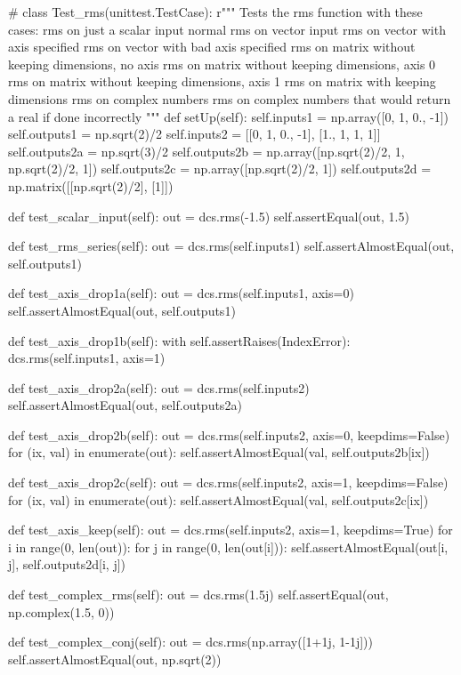 \documentclass[12pt]{article}
\begin{document}
\begin{Python}
#%
class Test_rms(unittest.TestCase):
    r"""
    Tests the rms function with these cases:
        rms on just a scalar input
        normal rms on vector input
        rms on vector with axis specified
        rms on vector with bad axis specified
        rms on matrix without keeping dimensions, no axis
        rms on matrix without keeping dimensions, axis 0
        rms on matrix without keeping dimensions, axis 1
        rms on matrix with keeping dimensions
        rms on complex numbers
        rms on complex numbers that would return a real if done incorrectly
    """
    def setUp(self):
        self.inputs1   = np.array([0, 1, 0., -1])
        self.outputs1  = np.sqrt(2)/2
        self.inputs2   = [[0, 1, 0., -1], [1., 1, 1, 1]]
        self.outputs2a = np.sqrt(3)/2
        self.outputs2b = np.array([np.sqrt(2)/2, 1, np.sqrt(2)/2, 1])
        self.outputs2c = np.array([np.sqrt(2)/2, 1])
        self.outputs2d = np.matrix([[np.sqrt(2)/2], [1]])

    def test_scalar_input(self):
        out = dcs.rms(-1.5)
        self.assertEqual(out, 1.5)

    def test_rms_series(self):
        out = dcs.rms(self.inputs1)
        self.assertAlmostEqual(out, self.outputs1)

    def test_axis_drop1a(self):
        out = dcs.rms(self.inputs1, axis=0)
        self.assertAlmostEqual(out, self.outputs1)

    def test_axis_drop1b(self):
        with self.assertRaises(IndexError):
            dcs.rms(self.inputs1, axis=1)

    def test_axis_drop2a(self):
        out = dcs.rms(self.inputs2)
        self.assertAlmostEqual(out, self.outputs2a)

    def test_axis_drop2b(self):
        out = dcs.rms(self.inputs2, axis=0, keepdims=False)
        for (ix, val) in enumerate(out):
            self.assertAlmostEqual(val, self.outputs2b[ix])

    def test_axis_drop2c(self):
        out = dcs.rms(self.inputs2, axis=1, keepdims=False)
        for (ix, val) in enumerate(out):
            self.assertAlmostEqual(val, self.outputs2c[ix])

    def test_axis_keep(self):
        out = dcs.rms(self.inputs2, axis=1, keepdims=True)
        for i in range(0, len(out)):
            for j in range(0, len(out[i])):
                self.assertAlmostEqual(out[i, j], self.outputs2d[i, j])

    def test_complex_rms(self):
        out = dcs.rms(1.5j)
        self.assertEqual(out, np.complex(1.5, 0))

    def test_complex_conj(self):
        out = dcs.rms(np.array([1+1j, 1-1j]))
        self.assertAlmostEqual(out, np.sqrt(2))
\end{Python}
\end{document}
